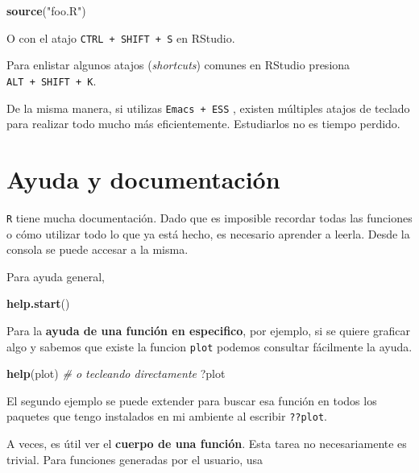 \documentclass[]{article}
\newenvironment{Shaded}{\begin{snugshade}}{\end{snugshade}}
\newcommand{\KeywordTok}[1]{\textcolor[rgb]{0.13,0.29,0.53}{\textbf{#1}}}
\newcommand{\StringTok}[1]{\textcolor[rgb]{0.31,0.60,0.02}{#1}}
\newcommand{\CommentTok}[1]{\textcolor[rgb]{0.56,0.35,0.01}{\textit{#1}}}
\newcommand{\NormalTok}[1]{#1}
\begin{document}
\begin{Shaded}
\begin{Highlighting}[]
\KeywordTok{source}\NormalTok{(}\StringTok{"foo.R"}\NormalTok{)}
\end{Highlighting}
\end{Shaded}

O con el atajo \texttt{CTRL\ +\ SHIFT\ +\ S} en RStudio.

Para enlistar algunos atajos (\emph{shortcuts}) comunes en RStudio
presiona \texttt{ALT\ +\ SHIFT\ +\ K}.

De la misma manera, si utilizas \texttt{Emacs\ +\ ESS}
\parencite{rossini2004ess}, existen múltiples atajos de teclado para
realizar todo mucho más eficientemente. Estudiarlos no es tiempo
perdido.

\section{Ayuda y documentación}\label{ayuda-y-documentacion}

\texttt{R} tiene mucha documentación. Dado que es imposible recordar
todas las funciones o cómo utilizar todo lo que ya está hecho, es
necesario aprender a leerla. Desde la consola se puede accesar a la
misma.

Para ayuda general,

\begin{Shaded}
\begin{Highlighting}[]
\KeywordTok{help.start}\NormalTok{()}
\end{Highlighting}
\end{Shaded}

Para la \textbf{ayuda de una función en especifico}, por ejemplo, si se
quiere graficar algo y sabemos que existe la funcion \texttt{plot}
podemos consultar fácilmente la ayuda.

\begin{Shaded}
\begin{Highlighting}[]
\KeywordTok{help}\NormalTok{(plot)}
\CommentTok{# o tecleando directamente}
\NormalTok{?plot}
\end{Highlighting}
\end{Shaded}

El segundo ejemplo se puede extender para buscar esa función en todos
los paquetes que tengo instalados en mi ambiente al escribir
\texttt{??plot}.

A veces, es útil ver el \textbf{cuerpo de una función}. Esta tarea no
necesariamente es trivial. Para funciones generadas por el usuario, usa
\end{document}
